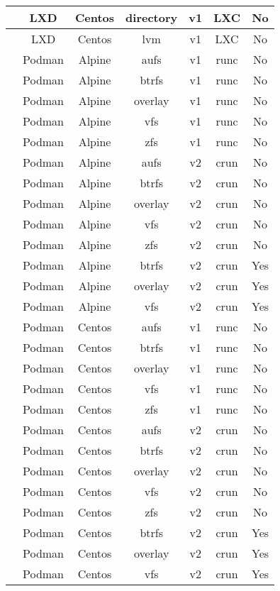 \begin{longtable}{|>{\stepcounter{rowno}\therowno}r|c|c|c|c|c|c|}
   & LXD    & Centos & directory     & v1 & LXC        & No\\ \hline
   & LXD    & Centos & lvm           & v1 & LXC        & No\\ \hline
   & Podman & Alpine & aufs          & v1 & runc       & No\\ \hline
   & Podman & Alpine & btrfs         & v1 & runc       & No\\ \hline
   & Podman & Alpine & overlay       & v1 & runc       & No\\ \hline
   & Podman & Alpine & vfs           & v1 & runc       & No\\ \hline
   & Podman & Alpine & zfs           & v1 & runc       & No\\ \hline
   & Podman & Alpine & aufs          & v2 & crun       & No\\ \hline
   & Podman & Alpine & btrfs         & v2 & crun       & No\\ \hline
   & Podman & Alpine & overlay       & v2 & crun       & No\\ \hline
   & Podman & Alpine & vfs           & v2 & crun       & No\\ \hline
   & Podman & Alpine & zfs           & v2 & crun       & No\\ \hline
   & Podman & Alpine & btrfs         & v2 & crun       & Yes\\ \hline
   & Podman & Alpine & overlay       & v2 & crun       & Yes\\ \hline
   & Podman & Alpine & vfs           & v2 & crun       & Yes\\ \hline
   & Podman & Centos & aufs          & v1 & runc       & No\\ \hline
   & Podman & Centos & btrfs         & v1 & runc       & No\\ \hline
   & Podman & Centos & overlay       & v1 & runc       & No\\ \hline
   & Podman & Centos & vfs           & v1 & runc       & No\\ \hline
   & Podman & Centos & zfs           & v1 & runc       & No\\ \hline
   & Podman & Centos & aufs          & v2 & crun       & No\\ \hline
   & Podman & Centos & btrfs         & v2 & crun       & No\\ \hline
   & Podman & Centos & overlay       & v2 & crun       & No\\ \hline
   & Podman & Centos & vfs           & v2 & crun       & No\\ \hline
   & Podman & Centos & zfs           & v2 & crun       & No\\ \hline
   & Podman & Centos & btrfs         & v2 & crun       & Yes\\ \hline
   & Podman & Centos & overlay       & v2 & crun       & Yes\\ \hline
   & Podman & Centos & vfs           & v2 & crun       & Yes\\ \hline
\end{longtable}

